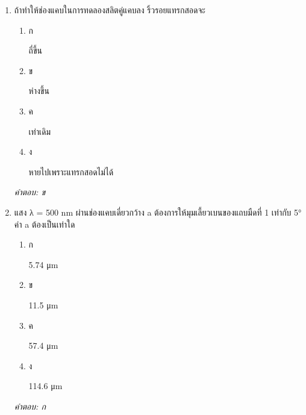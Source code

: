 \documentclass[12pt]{article}
\begin{document}
\begin{enumerate}[label=\arabic*., itemsep=0.5\baselineskip, topsep=0.5\baselineskip, leftmargin=*]
\item ถ้าทำให้ช่องแคบในการทดลองสลิตคู่แคบลง ริ้วรอยแทรกสอดจะ
\begin{enumerate}[label=\alph*)., itemsep=0.3\baselineskip, topsep=0.3\baselineskip]
\item ก\ 
\begin{minipage}[t]{0.9\linewidth}
\raggedright ถี่ขึ้น
\end{minipage}
\item ข\ 
\begin{minipage}[t]{0.9\linewidth}
\raggedright ห่างขึ้น
\end{minipage}
\item ค\ 
\begin{minipage}[t]{0.9\linewidth}
\raggedright เท่าเดิม
\end{minipage}
\item ง\ 
\begin{minipage}[t]{0.9\linewidth}
\raggedright หายไปเพราะแทรกสอดไม่ได้
\end{minipage}
\end{enumerate}
\vspace{-0.3\baselineskip}
\begin{small}
\textit{คำตอบ: ข}
\end{small}

\item แสง λ = 500 nm ผ่านช่องแคบเดี่ยวกว้าง a ต้องการให้มุมเลี้ยวเบนของแถบมืดที่ 1 เท่ากับ 5° ค่า a ต้องเป็นเท่าใด
\begin{enumerate}[label=\alph*)., itemsep=0.3\baselineskip, topsep=0.3\baselineskip]
\item ก\ 
\begin{minipage}[t]{0.9\linewidth}
\raggedright 5.74 μm
\end{minipage}
\item ข\ 
\begin{minipage}[t]{0.9\linewidth}
\raggedright 11.5 μm
\end{minipage}
\item ค\ 
\begin{minipage}[t]{0.9\linewidth}
\raggedright 57.4 μm
\end{minipage}
\item ง\ 
\begin{minipage}[t]{0.9\linewidth}
\raggedright 114.6 μm
\end{minipage}
\end{enumerate}
\vspace{-0.3\baselineskip}
\begin{small}
\textit{คำตอบ: ก}
\end{small}


\end{enumerate}
\end{document}
